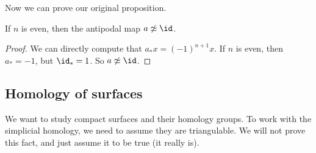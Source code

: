 \documentclass[a4paper]{article}
\begin{document}
Now we can prove our original proposition.
\begin{prop}
  If $n$ is even, then the antipodal map $a \not\simeq \id$.
\end{prop}

\begin{proof}
  We can directly compute that $a_* x = (- 1)^{n + 1}x$. If $n$ is even, then $a_* = -1$, but $\id_* = 1$. So $a \not\simeq \id$.
\end{proof}

\subsection{Homology of surfaces}
We want to study compact surfaces and their homology groups. To work with the simplicial homology, we need to assume they are triangulable. We will not prove this fact, and just assume it to be true (it really is).
\end{document}
